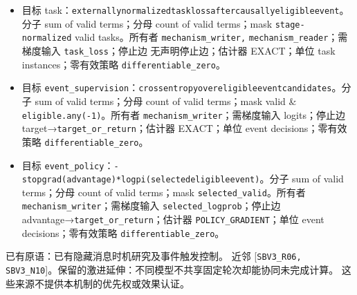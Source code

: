 \documentclass[
  10pt,
]{article}
\begin{document}
\begin{itemize}
\item
  目标
  task：{\small\nolinkurl{externally}\hspace{0.333em}\nolinkurl{normalized}\hspace{0.333em}\nolinkurl{task}\hspace{0.333em}\nolinkurl{loss}\hspace{0.333em}\nolinkurl{after}\hspace{0.333em}\nolinkurl{causally}\hspace{0.333em}\nolinkurl{eligible}\hspace{0.333em}\nolinkurl{event}}。分子
  sum of valid terms；分母 count of valid terms；mask
  \nolinkurl{stage-normalized} valid tasks。所有者
  \nolinkurl{mechanism_writer,} \nolinkurl{mechanism_reader}；需梯度输入
  \nolinkurl{task_loss}；停止边 无声明停止边；估计器 EXACT；单位 task
  instances；零有效策略 \nolinkurl{differentiable_zero}。
\item
  目标
  \nolinkurl{event_supervision}：{\small\nolinkurl{cross}\hspace{0.333em}\nolinkurl{entropy}\hspace{0.333em}\nolinkurl{over}\hspace{0.333em}\nolinkurl{eligible}\hspace{0.333em}\nolinkurl{event}\hspace{0.333em}\nolinkurl{candidates}}。分子
  sum of valid terms；分母 count of valid terms；mask valid \&
  \nolinkurl{eligible.any(-1)}。所有者
  \nolinkurl{mechanism_writer}；需梯度输入 logits；停止边
  target→\nolinkurl{target_or_return}；估计器 EXACT；单位 event
  decisions；零有效策略 \nolinkurl{differentiable_zero}。
\item
  目标
  \nolinkurl{event_policy}：{\small\nolinkurl{-stopgrad(advantage)*log}\hspace{0.333em}\nolinkurl{pi(selected}\hspace{0.333em}\nolinkurl{eligible}\hspace{0.333em}\nolinkurl{event)}}。分子
  sum of valid terms；分母 count of valid terms；mask
  \nolinkurl{selected_valid}。所有者
  \nolinkurl{mechanism_writer}；需梯度输入
  \nolinkurl{selected_logprob}；停止边
  advantage→\nolinkurl{target_or_return}；估计器
  \nolinkurl{POLICY_GRADIENT}；单位 event decisions；零有效策略
  \nolinkurl{differentiable_zero}。
\end{itemize}

已有原语：已有隐藏消息时机研究及事件触发控制。 近邻
{[}\nolinkurl{SBV3_R06,}
\nolinkurl{SBV3_N10}{]}。保留的激进延伸：不同模型不共享固定轮次却能协同未完成计算。
这些来源不提供本机制的优先权或效果认证。
\end{document}
